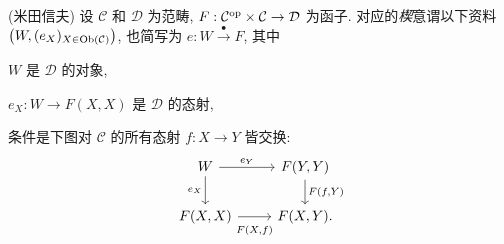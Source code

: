 \begin{Exercises}
	\item (米田信夫) 设 $\mathcal{C}$ 和 $\mathcal{D}$ 为范畴, $F: \mathcal{C}^{\operatorname{op}} \times \mathcal{C} \to \mathcal{D}$ 为函子. 对应的\emph{楔}意谓以下资料 $\left( W, (e_X)_{X \in \operatorname{Ob}(\mathcal{C})}\right)$, 也简写为 $e: W \xrightarrow{\bullet} F$, 其中
	\begin{compactitem}
		\item $W$ 是 $\mathcal{D}$ 的对象,
		\item $e_X: W \to F(X, X)$ 是 $\mathcal{D}$ 的态射,
	\end{compactitem}
	条件是下图对 $\mathcal{C}$ 的所有态射 $f: X \to Y$ 皆交换:
	\[\begin{tikzcd}
		W \arrow[r, "e_Y"] \arrow[d, "e_X"'] & F(Y, Y) \arrow[d, "{F(f, Y)}"] \\
		F(X, X) \arrow[r, "{F(X, f)}"' inner sep=0.6em] & F(X, Y).
	\end{tikzcd}\]
	

\end{Exercises}
